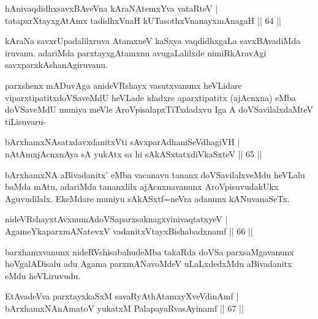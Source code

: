 
\begin{shl}
hAnivaqdidhxsavxBAveVna kAraNAtemxYva vataRteV |\\
tatapxrXtayxgAtAmx tadidhxVnaH kUTasothxV\s nanayxmAnagaH \hfill || 64 ||
\end{shl}

\begin{artha}
kAraNa savxrUpadalilxruva AtamxneV kaSxya vaqdidhxgaLa savxBAvadiMda iruvanu. adariMda parxtayxgAtamxnu avugaLalilxde nimiRkAravAgi savxparxkAshanAgiruvanu.

parxshenx mADuvAga anideVRshayx vasutxvanunx heVLidare viparxtipatitxdoVSaveMdU heVLade idadxre aparxtipatitx (ajAcnxna) eMba doVSaveMdU muniya meVle AroVpisalapxTiTxdadxvu Iga A doVSavilalxdaMteV tiLisuvaru-
\end{artha}

\begin{shl}
bArxhamxNAsatxdavxdanitxVti sAvxparAdhaniSeVdhagiVH |\\
nA\s \s tAmxjAcnxnAya sA yukAtx sa hi sAkASxtatxdiVkaSxteV \hfill || 65 ||
\end{shl}

\begin{artha}
bArxhamxNA aBivadanitx' eMba vacanavu tananx doVSavilalxveMdu heVLalu baMda mAtu, adariMda tananxlilx ajAcnxnavanunx AroVpisuvudakUkx Aguvudilalx. EkeMdare muniyu sAkASxtf=neVra adanunx kANuvanaSeTx.
\end{artha}


\begin{shl}
nideVRshayxtAvxnumAdoVSaparxsaknagxvinivaqtatxyeV |\\
AgameYkaparxmANatevxV vadanitxVtayxBishabadxnamf \hfill || 66 ||
\end{shl}

\begin{artha}
barxhamxvanunx nideRVshisabahudeMba takaRda doVSa parxsaMgavanunx \-hoVgalADisalu adu Agama parxmANavoMdeV uLaLxdedxMdu aBivadanitx eMdu heVLiruvudu.
\end{artha}

\begin{shl}
EtAvadeVva parxtayxkaSxM savaRyAthAtamxyXveVdinAmf |\\
bArxhamxNAnAmatoV yukatxM PalapayaRvasAyinamf \hfill || 67 ||
\end{shl}

